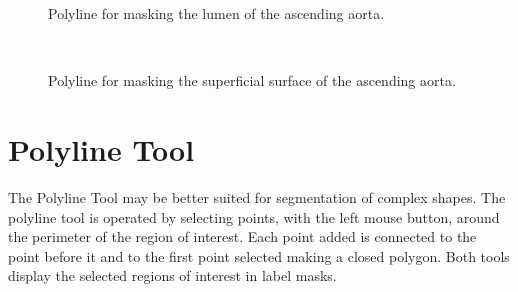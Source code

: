 \documentclass[fleqn,11pt,openany]{book}
\begin{document}
\begin{figure}
\caption{Polyline for masking the lumen of the ascending aorta.}\label{fig:polylinelumen}
\end{figure}

\begin{figure}
\\
\caption{Polyline for masking the superficial surface of the ascending aorta.}
\label{fig:polylinesuperficial}
\end{figure}

\section{Polyline Tool} 

The Polyline Tool may be better suited for segmentation of complex shapes.  The polyline tool is operated by selecting points, with the left mouse button, around the perimeter of the region of interest.  Each point added is connected to the point before it and to the first point selected making a closed polygon.  Both tools display the selected regions of interest in label masks.
\end{document}
